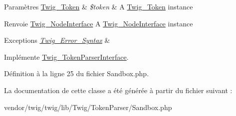 \begin{DoxyParams}[1]{Paramètres}
\hyperlink{class_twig___token}{Twig\+\_\+\+Token} & {\em \$token} & A \hyperlink{class_twig___token}{Twig\+\_\+\+Token} instance\\
\hline
\end{DoxyParams}
\begin{DoxyReturn}{Renvoie}
\hyperlink{interface_twig___node_interface}{Twig\+\_\+\+Node\+Interface} A \hyperlink{interface_twig___node_interface}{Twig\+\_\+\+Node\+Interface} instance
\end{DoxyReturn}

\begin{DoxyExceptions}{Exceptions}
{\em \hyperlink{class_twig___error___syntax}{Twig\+\_\+\+Error\+\_\+\+Syntax}} & \\
\hline
\end{DoxyExceptions}


Implémente \hyperlink{interface_twig___token_parser_interface_a5dfa2e269321584fb74e8b43dabe0efd}{Twig\+\_\+\+Token\+Parser\+Interface}.



Définition à la ligne 25 du fichier Sandbox.\+php.



La documentation de cette classe a été générée à partir du fichier suivant \+:\begin{DoxyCompactItemize}
\item 
vendor/twig/twig/lib/\+Twig/\+Token\+Parser/Sandbox.\+php\end{DoxyCompactItemize}
